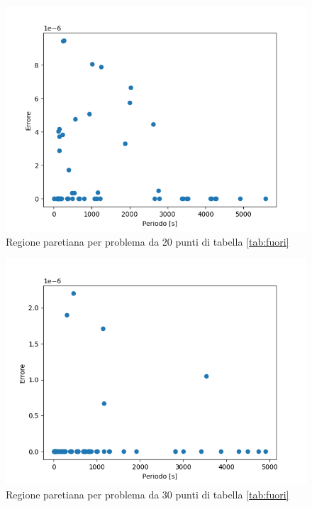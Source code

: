 \documentclass[a4paper,12pt]{report}
\begin{document}
\begin{itemize}
  \begin{figure}[H]
    \centering
    \includegraphics[scale=0.70]{img/puls0010/standard20.png}
    \caption{Regione paretiana per problema da 20 punti di tabella \ref{tab:fuori}}
    \label{fig:reg_ammis_20_0010_std}
  \end{figure}

  \begin{figure}[H]
    \centering
    \includegraphics[scale=0.70]{img/puls0010/standard30.png}
    \caption{Regione paretiana per problema da 30 punti di tabella \ref{tab:fuori}}
    \label{fig:reg_ammis_30_0010_std}
  \end{figure}



\end{itemize}
\end{document}
